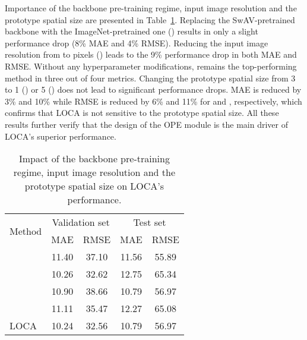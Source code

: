 \documentclass[10pt,twocolumn,letterpaper]{article}
\begin{document}
Importance of the backbone pre-training regime, input image resolution and the prototype spatial size are presented in Table~\ref{tab:other}.
Replacing the SwAV-pretrained backbone with the ImageNet-pretrained one () results in only a slight performance drop (8\% MAE and 4\% RMSE). 
Reducing the input image resolution from  to  pixels () leads to the 9\% performance drop in both MAE and RMSE. 
Without any hyperparameter modifications,  remains the top-performing method in three out of four metrics.
Changing the prototype spatial size  from 3 to 1 () or 5 () does not lead to significant performance drops. 
MAE is reduced by 3\% and 10\% while RMSE is reduced by 6\% and 11\% for  and , respectively, which confirms that LOCA is not sensitive to the prototype spatial size. 
All these results further verify that the design of the OPE module is the main driver of LOCA's superior performance.



\begin{table}[htbp]
    \centering
    \begin{tabular}{l c c c c}
        \toprule
        \multirow{2}{*}{Method}& \multicolumn{2}{c}{Validation set} & \multicolumn{2}{c}{Test set} \\
        & MAE & RMSE & MAE & RMSE \\ 
        \midrule
                 & 11.40 & 37.10 & 11.56 & 55.89 \\
                   & 10.26 & 32.62 & 12.75 & 65.34 \\
                   & 10.90 & 38.66 & 10.79 & 56.97 \\
                   & 11.11 & 35.47 & 12.27 & 65.08 \\
        LOCA                   & 10.24 & 32.56 & 10.79 & 56.97 \\
        \bottomrule
    \end{tabular}
    \caption{Impact of the backbone pre-training regime, input image resolution and the prototype spatial size on LOCA's performance.}
    \label{tab:other}
\end{table}
\end{document}

